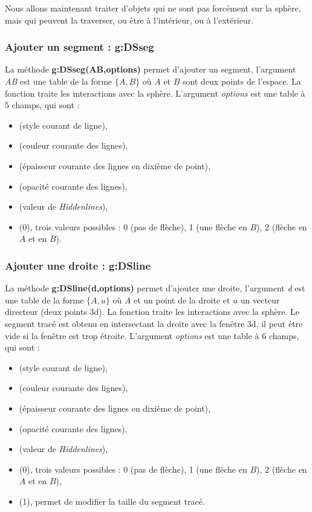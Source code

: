 Nous allons maintenant traiter d'objets qui ne sont pas forcément sur la sphère, mais qui peuvent la traverser, ou être à l'intérieur, ou à l'extérieur.

\subsubsection{ Ajouter un segment : g:DSseg}

La méthode \textbf{g:DSseg(AB,options)} permet d'ajouter un segment, l'argument \emph{AB} est une table de la forme $\{A,B\}$ où $A$ et $B$ sont deux points de l'espace. La fonction traite les interactions avec la sphère. L'argument \emph{options} est une table à 5 champs, qui sont :
    \begin{itemize}
        \item {} (style courant de ligne), 
        \item {} (couleur courante des lignes),
        \item {} (épaisseur courante des lignes en dixième de point),
        \item {} (opacité courante des lignes),
        \item {} (valeur de \emph{Hiddenlines}),
        \item {} (0), trois valeurs possibles : 0 (pas de flèche), 1 (une flèche en $B$), 2 (flèche en $A$ et en $B$).
    \end{itemize}
    
\subsubsection{Ajouter une droite : g:DSline}

La méthode \textbf{g:DSline(d,options)} permet d'ajouter une droite, l'argument \emph{d} est une table de la forme $\{A,u\}$ où $A$ et un point de la droite et $u$ un vecteur directeur (deux points 3d). La fonction traite les interactions avec la sphère.  Le segment tracé est obtenu en intersectant la droite avec la fenêtre 3d, il peut être vide si la fenêtre est trop étroite. L'argument \emph{options} est une table à 6 champs, qui sont :
    \begin{itemize}
        \item {} (style courant de ligne), 
        \item {} (couleur courante des lignes),
        \item {} (épaisseur courante des lignes en dixième de point),
        \item {} (opacité courante des lignes),
        \item {} (valeur de \emph{Hiddenlines}),
        \item {} (0), trois valeurs possibles : 0 (pas de flèche), 1 (une flèche en $B$), 2 (flèche en $A$ et en $B$),
        \item {} (1), permet de modifier la taille du segment tracé.
    \end{itemize}
    
